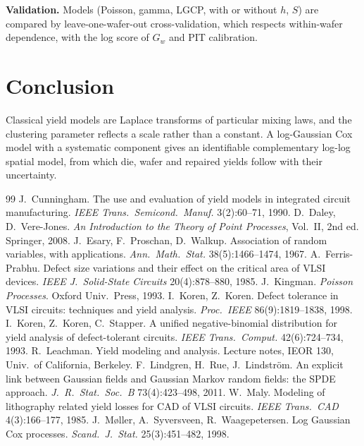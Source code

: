 \documentclass[10pt,twocolumn]{article}
\begin{document}
\textbf{Validation.} Models (Poisson, gamma, LGCP, with or without $h$, $S$) are compared by leave-one-wafer-out cross-validation, which respects within-wafer dependence, with the log score of $G_w$ and PIT calibration.

\section{Conclusion}
Classical yield models are Laplace transforms of particular mixing laws, and the clustering parameter reflects a scale rather than a constant. A log-Gaussian Cox model with a systematic component gives an identifiable complementary log-log spatial model, from which die, wafer and repaired yields follow with their uncertainty.

\footnotesize
\begin{thebibliography}{99}\setlength{\itemsep}{0pt}
 J.~Cunningham. The use and evaluation of yield models in integrated circuit manufacturing. \emph{IEEE Trans.\ Semicond.\ Manuf.} 3(2):60--71, 1990.
 D.~Daley, D.~Vere-Jones. \emph{An Introduction to the Theory of Point Processes}, Vol.~II, 2nd ed. Springer, 2008.
 J.~Esary, F.~Proschan, D.~Walkup. Association of random variables, with applications. \emph{Ann.\ Math.\ Stat.} 38(5):1466--1474, 1967.
 A.~Ferris-Prabhu. Defect size variations and their effect on the critical area of VLSI devices. \emph{IEEE J.\ Solid-State Circuits} 20(4):878--880, 1985.
 J.~Kingman. \emph{Poisson Processes}. Oxford Univ.\ Press, 1993.
 I.~Koren, Z.~Koren. Defect tolerance in VLSI circuits: techniques and yield analysis. \emph{Proc.\ IEEE} 86(9):1819--1838, 1998.
 I.~Koren, Z.~Koren, C.~Stapper. A unified negative-binomial distribution for yield analysis of defect-tolerant circuits. \emph{IEEE Trans.\ Comput.} 42(6):724--734, 1993.
 R.~Leachman. Yield modeling and analysis. Lecture notes, IEOR 130, Univ.\ of California, Berkeley.
 F.~Lindgren, H.~Rue, J.~Lindstr\"om. An explicit link between Gaussian fields and Gaussian Markov random fields: the SPDE approach. \emph{J.\ R.\ Stat.\ Soc.\ B} 73(4):423--498, 2011.
 W.~Maly. Modeling of lithography related yield losses for CAD of VLSI circuits. \emph{IEEE Trans.\ CAD} 4(3):166--177, 1985.
 J.~M{\o}ller, A.~Syversveen, R.~Waagepetersen. Log Gaussian Cox processes. \emph{Scand.\ J.\ Stat.} 25(3):451--482, 1998.

\end{thebibliography}
\end{document}
